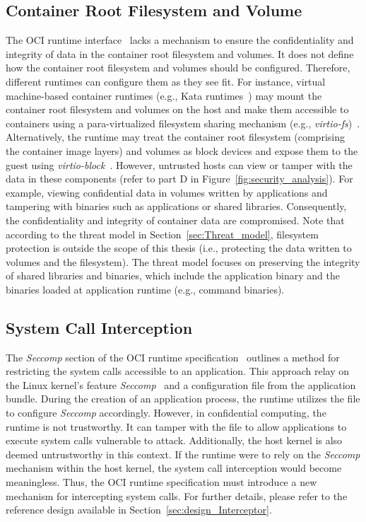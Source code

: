\subsection{Container Root Filesystem and Volume}

The OCI runtime interface~\cite*{oci-runtime-spec} lacks a mechanism to ensure the confidentiality and integrity of data in the container root filesystem and volumes. It does not define how the container root filesystem and volumes should be configured. Therefore, different runtimes can configure them as they see fit. For instance, virtual machine-based container 
runtimes (e.g., Kata runtimes~\cite*{Kata-Containers}) may mount the container root filesystem and volumes on the host and make them accessible to containers using a para-virtualized filesystem sharing mechanism (e.g., \emph{virtio-fs})~\cite*{kata_storage}. Alternatively, the runtime may treat the container root filesystem (comprising the container image layers) and volumes as block devices and expose them to the guest 
using \emph{virtio-block}~\cite*{kata_storage}. However, untrusted hosts can view or tamper with the data in these components (refer to part D in Figure~\ref{fig:security_analysis}). For example, viewing confidential data in volumes written by applications and tampering with binaries such as applications or shared libraries. Consequently, the confidentiality and 
integrity of container data are compromised. Note that according to the threat model in Section~\ref{sec:Threat_model}, filesystem protection is outside the scope of this thesis (i.e., protecting the data written to volumes and the filesystem). The threat model focuses on preserving the integrity of shared libraries and binaries, which include the application 
binary and the binaries loaded at application runtime (e.g., command binaries).


\subsection{System Call Interception}
\label{sec:security_analyse_oci_system_call}
The \emph{Seccomp} section of the OCI runtime specification~\cite*{oci-runtime-spec} outlines a method for restricting the system calls accessible to an application. This approach relay on the Linux kernel's feature \emph{Seccomp}~\cite*{seccomp} and a configuration file from the application bundle. During the creation of an application process, the runtime utilizes the file to configure \emph{Seccomp} accordingly. However, in confidential computing, the runtime is not trustworthy. 
It can tamper with the file to allow applications to execute system calls vulnerable to attack. Additionally, the host kernel is also deemed untrustworthy in this context. If the runtime were to rely on the \emph{Seccomp} mechanism within the host kernel, the system call interception would become meaningless. Thus, the OCI runtime specification must 
introduce a new mechanism for intercepting system calls. For further details, please refer to the reference design available in Section~\ref{sec:design_Interceptor}.


